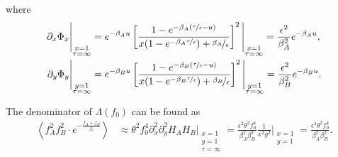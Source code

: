 \documentclass[11pt]{article}
\begin{document}
where
\begin{subequations}\begin{align}
    \partial_x \Phi_x \Bigg\vert_{\substack{x=1 \\ \tau=\infty}} &= e^{-\beta_A u} \left[\frac{1-e^{-\beta_A(\nicefrac{\tau}{\epsilon}-u)}}{x(1-e^{-\beta_A \nicefrac{\tau}{\epsilon}}) + \nicefrac{\beta_A}{\epsilon}}\right]^2\Bigg\vert_{\substack{x=1 \\ \tau=\infty}} = \frac{\epsilon^2}{\beta_A^2}e^{-\beta_A u}, \\
    \partial_y \Phi_y \Bigg\vert_{\substack{y=1 \\ \tau=\infty}} &= e^{-\beta_B u} \left[\frac{1-e^{-\beta_B(\nicefrac{\tau}{\epsilon}-u)}}{x(1-e^{-\beta_B \nicefrac{\tau}{\epsilon}}) + \nicefrac{\beta_B}{\epsilon}}\right]^2\Bigg\vert_{\substack{y=1 \\ \tau=\infty}} = \frac{\epsilon^2}{\beta_B^2}e^{-\beta_B u}.
\end{align}\end{subequations}

The denominator of $\Lambda(f_0)$ can be found as 
\begin{align}
    \left\langle f_A^2f_B^2\cdot e^{-\frac{f_{A}+f_{B}}{f_0}}\right\rangle &\approx \theta^2 f_0^4 \partial_x^2 \partial_y^2 H_A H_B \Bigg\vert_{\substack{x=1 \\ y=1 \\ \tau=\infty}} = \frac{\epsilon^2 \theta^2 f_0^4}{\beta_A^2 \beta_B^2} \frac{1}{x^2y^2}\Bigg\vert_{\substack{x=1 \\ y=1}} = \frac{\epsilon^4 \theta^2 f_0^4}{\beta_A^2 \beta_B^2}.
\end{align}
\end{document}
